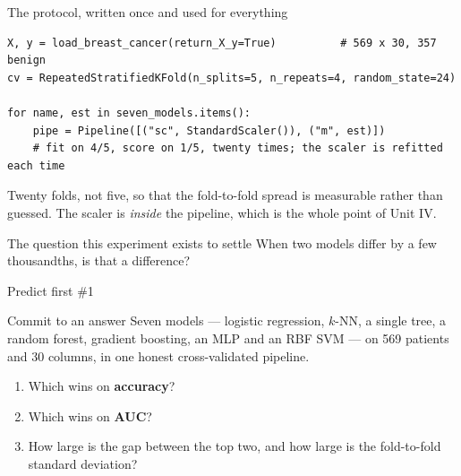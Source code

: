 \documentclass[aspectratio=169]{beamer}
\begin{document}
\begin{frame}[fragile]{The protocol, written once and used for everything}
\begin{lstlisting}
X, y = load_breast_cancer(return_X_y=True)          # 569 x 30, 357 benign
cv = RepeatedStratifiedKFold(n_splits=5, n_repeats=4, random_state=24)

for name, est in seven_models.items():
    pipe = Pipeline([("sc", StandardScaler()), ("m", est)])
    # fit on 4/5, score on 1/5, twenty times; the scaler is refitted each time
\end{lstlisting}
  \begin{center}
    \small Twenty folds, not five, so that the fold-to-fold spread is
    measurable rather than guessed. The scaler is \emph{inside} the pipeline,
    which is the whole point of Unit IV.
  \end{center}
  \begin{alertblock}{The question this experiment exists to settle}
    When two models differ by a few thousandths, is that a difference?
  \end{alertblock}
\end{frame}

\begin{frame}[shrink=6]{Predict first \#1}
  \begin{block}{Commit to an answer}
    Seven models --- logistic regression, $k$-NN, a single tree, a random
    forest, gradient boosting, an MLP and an RBF SVM --- on 569 patients and
    30 columns, in one honest cross-validated pipeline.
    \begin{enumerate}
      \item Which wins on \textbf{accuracy}?
      \item Which wins on \textbf{AUC}?
      \item How large is the gap between the top two, and how large is the
        fold-to-fold standard deviation?
    \end{enumerate}
  \end{block}
\end{frame}
\end{document}
